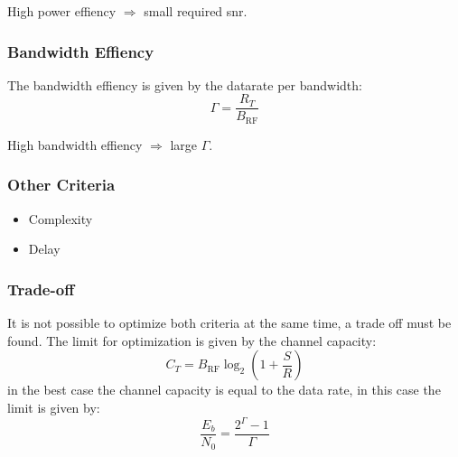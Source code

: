 High power effiency $\Rightarrow$ small required \ac{snr}. 

\subsubsection{Bandwidth Effiency}
The bandwidth effiency is given by the datarate per bandwidth:
\begin{equation}
    \Gamma = \frac{R_T}{B_\text{RF}}
\end{equation}

High bandwidth effiency $\Rightarrow$ large $\Gamma$.

\subsubsection{Other Criteria}
\begin{itemize}
    \item Complexity
    \item Delay
\end{itemize}

\subsubsection{Trade-off}
It is not possible to optimize both criteria at the same time, a trade off must be found.
The limit for optimization is given by the channel capacity:
\begin{equation}
    C_T = B_\text{RF} \log_2 \left(1 + \frac{S}{R}\right)
\end{equation}
in the best case the channel capacity is equal to the data rate, in this case the limit
is given by:
\begin{equation}
    \frac{E_b}{N_0} = \frac{2^\Gamma -1}{\Gamma}
\end{equation}
